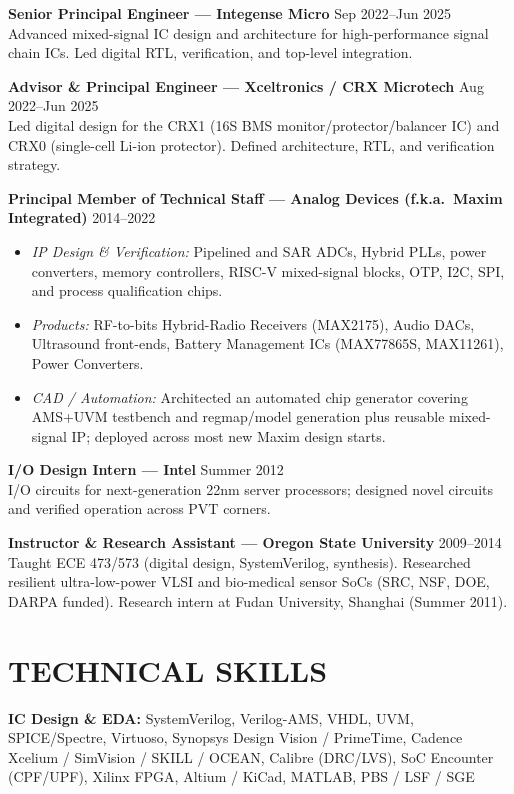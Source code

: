 \documentclass[line,margin]{res}
\begin{document}
\begin{resume}
\textbf{Senior Principal Engineer --- Integense Micro} \hfill Sep 2022--Jun 2025 \\
Advanced mixed-signal IC design and architecture for high-performance signal chain ICs.
Led digital RTL, verification, and top-level integration.

\textbf{Advisor \& Principal Engineer --- Xceltronics / CRX Microtech} \hfill Aug 2022--Jun 2025 \\
Led digital design for the CRX1 (16S BMS monitor/protector/balancer IC) and CRX0
(single-cell Li-ion protector). Defined architecture, RTL, and verification strategy.

\textbf{Principal Member of Technical Staff --- Analog Devices (f.k.a.\ Maxim Integrated)}
\hfill 2014--2022

\begin{itemize}
  \item \textit{IP Design \& Verification:} Pipelined and SAR ADCs, Hybrid PLLs, power converters,
        memory controllers, RISC-V mixed-signal blocks, OTP, I2C, SPI, and process qualification chips.
  \item \textit{Products:} RF-to-bits Hybrid-Radio Receivers (MAX2175), Audio DACs, Ultrasound
        front-ends, Battery Management ICs (MAX77865S, MAX11261), Power Converters.
  \item \textit{CAD / Automation:} Architected an automated chip generator covering AMS+UVM
        testbench and regmap/model generation plus reusable mixed-signal IP; deployed across
        most new Maxim design starts.
\end{itemize}

\textbf{I/O Design Intern --- Intel} \hfill Summer 2012 \\
I/O circuits for next-generation 22nm server processors; designed novel circuits and verified
operation across PVT corners.

\textbf{Instructor \& Research Assistant --- Oregon State University} \hfill 2009--2014 \\
Taught ECE 473/573 (digital design, SystemVerilog, synthesis). Researched resilient ultra-low-power
VLSI and bio-medical sensor SoCs (SRC, NSF, DOE, DARPA funded). Research intern at Fudan
University, Shanghai (Summer 2011).


\section{TECHNICAL SKILLS}

\textbf{IC Design \& EDA:} SystemVerilog, Verilog-AMS, VHDL, UVM, SPICE/Spectre, Virtuoso,
  Synopsys Design Vision / PrimeTime, Cadence Xcelium / SimVision / SKILL / OCEAN, Calibre (DRC/LVS),
  SoC Encounter (CPF/UPF), Xilinx FPGA, Altium / KiCad, MATLAB, PBS / LSF / SGE


\end{resume}
\end{document}

